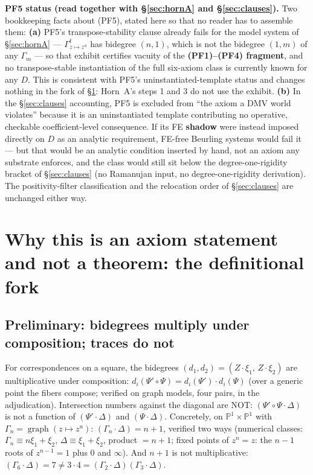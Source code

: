 \documentclass[11pt]{article}
\theoremstyle{plain}
\theoremstyle{definition}
\theoremstyle{remark}
\begin{document}
\medskip
\noindent\textbf{PF5 status (read together with \S\ref{sec:hornA} and
\S\ref{sec:clauses}).} Two bookkeeping facts about (PF5), stated here so that no
reader has to assemble them: \textbf{(a)} PF5's transpose-stability clause
already fails for the model system of \S\ref{sec:hornA} ---
$\Gamma_{z \mapsto z^n}^t$ has bidegree $(n, 1)$, which is not the bidegree
$(1, m)$ of any $\Gamma_m$ --- so that exhibit certifies vacuity of the
\textbf{(PF1)--(PF4) fragment}, and no transpose-stable instantiation of the full
six-axiom class is currently known for any $D$. This is consistent with PF5's
uninstantiated-template status and changes nothing in the fork of
\S\ref{sec:fork}: Horn~A's steps 1 and 3 do not use the exhibit. \textbf{(b)} In
the \S\ref{sec:clauses} accounting, PF5 is excluded from ``the axiom a DMV world
violates'' because it is an uninstantiated template contributing no operative,
checkable coefficient-level consequence. If its FE \textbf{shadow} were instead
imposed directly on $D$ as an analytic requirement, FE-free Beurling systems
would fail it --- but that would be an analytic condition inserted by hand, not
an axiom any substrate enforces, and the class would still sit below the
degree-one-rigidity bracket of \S\ref{sec:clauses} (no Ramanujan input, no
degree-one-rigidity derivation). The positivity-filter classification and the
relocation order of \S\ref{sec:clauses} are unchanged either way.

\section{Why this is an axiom statement and not a theorem: the definitional
fork}\label{sec:fork}

\subsection{Preliminary: bidegrees multiply under composition; traces do
not}\label{sec:bidegrees}

For correspondences on a square, the bidegrees
$(d_1, d_2) = (Z \cdot \xi_1,\, Z \cdot \xi_2)$ are multiplicative under
composition: $d_i(\Psi' \circ \Psi) = d_i(\Psi') \cdot d_i(\Psi)$ (over a
generic point the fibers compose; verified on graph models, four pairs, in the
adjudication). Intersection numbers against the diagonal are NOT:
$(\Psi' \circ \Psi \cdot \Delta)$ is not a function of $(\Psi' \cdot \Delta)$
and $(\Psi \cdot \Delta)$. Concretely, on $\mathbb{P}^1 \times \mathbb{P}^1$
with $\Gamma_n = \operatorname{graph}(z \mapsto z^n)$:
$(\Gamma_n \cdot \Delta) = n + 1$, verified two ways (numerical classes:
$\Gamma_n \equiv n\xi_1 + \xi_2$, $\Delta \equiv \xi_1 + \xi_2$, product
$= n + 1$; fixed points of $z^n = z$: the $n - 1$ roots of $z^{n-1} = 1$ plus
$0$ and $\infty$). And $n + 1$ is not multiplicative:
$(\Gamma_6 \cdot \Delta) = 7 \ne 3 \cdot 4 =
(\Gamma_2 \cdot \Delta)(\Gamma_3 \cdot \Delta)$.
\end{document}
